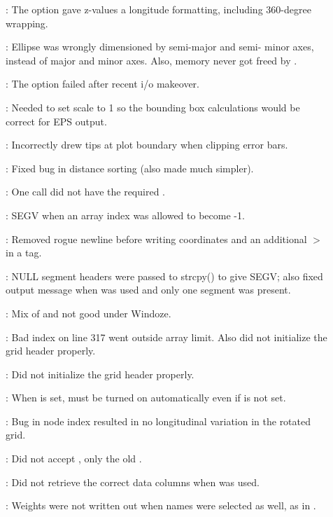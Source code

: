 \begin{description}
	\item []:	The  option gave z-values a longitude formatting, including 360-degree wrapping.
	\item []:	Ellipse was wrongly dimensioned by semi-major and semi-
		minor axes, instead of major and minor axes.  Also, memory never got freed by .
	\item []:	The  option failed after recent i/o makeover.
	\item []:	Needed to set scale to 1 so the bounding box
		calculations would be correct for EPS output.
	\item []:	Incorrectly drew tips at plot boundary when clipping error bars.
	\item []:	Fixed bug in distance sorting (also made much simpler).
	\item []:	One  call did not have the required .
	\item []:	SEGV when an array index was allowed to become -1.
	\item []:	Removed rogue newline before writing coordinates and an additional $>$ in a tag.
	\item []:	NULL segment headers were passed to strcpy() to give SEGV; also
		fixed output message when  was used and only one segment was present.
	\item []:	Mix of  and  not good under Windoze.
	\item []:	Bad index on line 317 went outside array limit.  Also did not initialize the grid header properly.
	\item []:	Did not initialize the grid header properly.
	\item []:	When  is set,  must be turned on automatically
		even if  is not set.
	\item []:	Bug in node index resulted in no longitudinal variation in the rotated grid.
	\item []:	Did not accept , only the old .
	\item []:	Did not retrieve the correct data columns when  was used.
	\item []:	Weights were not written out when names were selected as well, as in .
\end{description}


